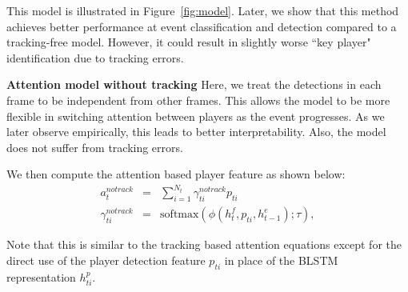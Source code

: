 This model is illustrated in Figure~\ref{fig:model}.
Later, we show that this method achieves better
performance at event classification and detection compared to a
tracking-free model. However, it could result in slightly worse ``key player"
identification due to tracking errors.

\noindent \textbf{Attention model without tracking}
Here, we treat the detections in each frame to be independent from other
frames.  This allows the model to be more flexible in switching attention
between players as the event progresses.  As we later observe empirically, this
leads to better interpretability.  Also, the model does not suffer from
tracking errors.

We then compute the attention based player feature as shown below:
\begin{eqnarray} 
\label{eq:notrack}
  a_t^{notrack} & = & \sum_{i=1}^{N_t} \gamma_{ti}^{notrack} p_{ti}
\\ \nonumber
  \gamma_{ti}^{notrack} & = & \text{softmax} \left(\phi\left(h^f_t, p_{ti}, h^e_{t-1}\right); \tau\right),
\end{eqnarray}

Note that this is similar to the tracking based attention equations except for
the direct use of the player detection feature $p_{ti}$ in place of the
BLSTM representation $h_{ti}^p$.
